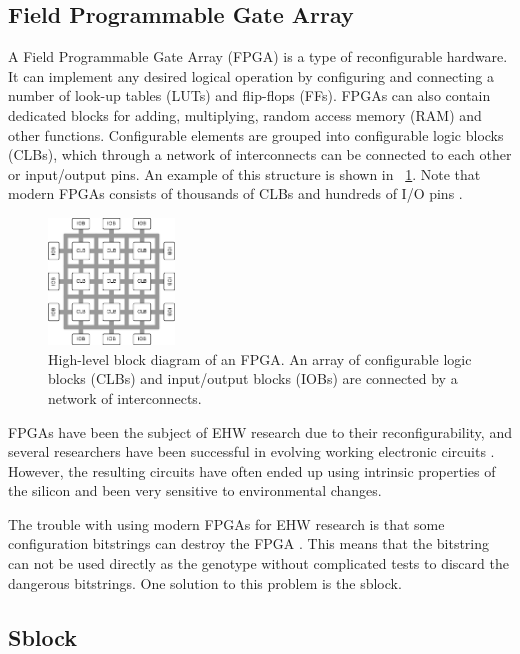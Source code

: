 \subsection{Field Programmable Gate Array}

A Field Programmable Gate Array (FPGA) is a type of reconfigurable hardware.
It can implement any desired logical operation by configuring and connecting a number of look-up tables (LUTs) and flip-flops (FFs).
FPGAs can also contain dedicated blocks for adding, multiplying, random access memory (RAM) and other functions.
Configurable elements are grouped into configurable logic blocks (CLBs), which through a network of interconnects can be connected to each other or input/output pins.
An example of this structure is shown in \figurename~\ref{fig:fpga}.
Note that modern FPGAs consists of thousands of CLBs and hundreds of I/O pins \cite{ds160}.

\begin{figure}[!ht]
    \centering
    \includegraphics[width=0.30\textwidth]{figures/fpga}
    \caption{High-level block diagram of an FPGA. An array of configurable logic blocks (CLBs) and input/output blocks (IOBs) are connected by a network of interconnects.}
    \label{fig:fpga}
\end{figure}

FPGAs have been the subject of EHW research due to their reconfigurability, and several researchers have been successful in evolving working electronic circuits \cite{huelsbergen1998evolution, thompson1997evolved}.
However, the resulting circuits have often ended up using intrinsic properties of the silicon and been very sensitive to environmental changes.

The trouble with using modern FPGAs for EHW research is that some configuration bitstrings can destroy the FPGA \cite{ug380, xapp151}.
This means that the bitstring can not be used directly as the genotype without complicated tests to discard the dangerous bitstrings.
One solution to this problem is the sblock. 

\subsection{Sblock}

